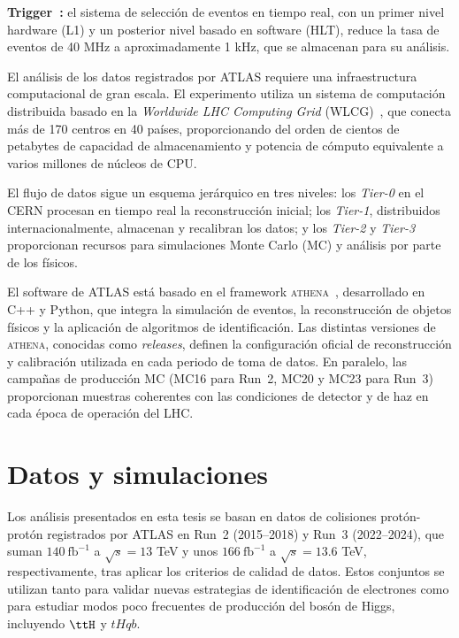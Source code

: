 \textbf{Trigger~\cite{trigger_run2}:} el sistema de selección de eventos en tiempo real, con un primer nivel hardware (L1) y un posterior nivel basado en software (HLT), reduce la tasa de eventos de 40 MHz a aproximadamente 1 kHz, que se almacenan para su análisis.

El análisis de los datos registrados por ATLAS requiere una infraestructura computacional de gran escala. El experimento utiliza un sistema de computación distribuida basado en la \textit{Worldwide LHC Computing Grid} (WLCG)~\cite{Bird:1695401}, que conecta más de 170 centros en 40 países, proporcionando del orden de cientos de petabytes de capacidad de almacenamiento y potencia de cómputo equivalente a varios millones de núcleos de CPU.  

El flujo de datos sigue un esquema jerárquico en tres niveles: los \textit{Tier-0} en el CERN procesan en tiempo real la reconstrucción inicial; los \textit{Tier-1}, distribuidos internacionalmente, almacenan y recalibran los datos; y los \textit{Tier-2} y \textit{Tier-3} proporcionan recursos para simulaciones Monte Carlo (MC) y análisis por parte de los físicos.  

El software de ATLAS está basado en el framework \textsc{athena}~\cite{athena}, desarrollado en C++ y Python, que integra la simulación de eventos, la reconstrucción de objetos físicos y la aplicación de algoritmos de identificación. Las distintas versiones de \textsc{athena}, conocidas como \textit{releases}, definen la configuración oficial de reconstrucción y calibración utilizada en cada periodo de toma de datos. En paralelo, las campañas de producción MC (MC16 para Run~2, MC20 y MC23 para Run~3) proporcionan muestras coherentes con las condiciones de detector y de haz en cada época de operación del LHC.  

\section*{Datos y simulaciones}

Los análisis presentados en esta tesis se basan en datos de colisiones protón-protón registrados por ATLAS en Run~2 (2015–2018) y Run~3 (2022–2024), que suman $140~\text{fb}^{-1}$ a $\sqrt{s}=13$ TeV y unos $166~\text{fb}^{-1}$ a $\sqrt{s}=13.6$ TeV, respectivamente, tras aplicar los criterios de calidad de datos. Estos conjuntos se utilizan tanto para validar nuevas estrategias de identificación de electrones como para estudiar modos poco frecuentes de producción del bosón de Higgs, incluyendo \(\ttH\) y \(tHqb\).  

